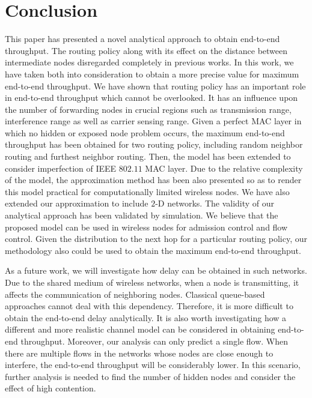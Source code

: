 \documentclass[12pt, draftclsnofoot, onecolumn]{IEEEtran}
\begin{document}

\section{Conclusion}
\label{conclusion}
This paper has presented a novel analytical approach to obtain 
end-to-end throughput. The routing policy 
along with its effect on the distance between intermediate nodes 
disregarded completely in previous works. In this work, we have  
taken both into consideration to obtain a more precise value for 
maximum end-to-end throughput. We have shown that routing policy 
has an important role in end-to-end throughput which cannot be overlooked. 
It has an influence upon the number of forwarding nodes in crucial regions 
such as transmission range, interference range as well as carrier sensing 
range.
Given a perfect MAC layer in which no hidden or exposed node problem 
occurs, the maximum end-to-end throughput has been obtained for two 
routing policy, including random neighbor routing and furthest neighbor 
routing. Then, the model has been extended to consider imperfection 
of IEEE $802.11$ MAC layer. Due to the relative complexity of the model, 
the approximation method has been also presented so as to render this 
model practical for computationally limited wireless nodes. We have also 
extended our approximation to include $2$-D networks. The validity 
of our analytical approach has been validated by simulation. We believe 
that the proposed model can be used in wireless nodes for admission control 
and flow control. Given the distribution to the next hop for a particular 
routing policy, our methodology also could be used to obtain the maximum 
end-to-end throughput.

As a future work, we will investigate how delay can be obtained in such networks. Due to the shared medium of wireless networks, when a node is transmitting, it affects the communication of neighboring nodes. Classical queue-based approaches cannot deal with this dependency. Therefore, it is more difficult to obtain the end-to-end delay analytically. It is also worth investigating how a different and more realistic channel model can be considered in obtaining end-to-end throughput. Moreover, our analysis can only predict a single flow. When there are multiple flows in the networks whose nodes are close enough to interfere, the end-to-end throughput will be considerably lower. In this scenario, further analysis is needed to find the number of hidden nodes and consider the effect of high contention.
\end{document}
